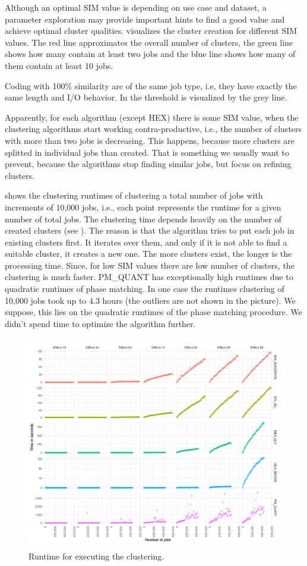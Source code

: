 \documentclass[]{llncs}
\begin{document}
Although an optimal SIM value is depending on use case and dataset, a parameter exploration may provide important hints to find a good value and achieve optimal cluster qualities.
 visualizes the cluster creation for different SIM values.
The red line approximates the overall number of clusters, the green line shows how many contain at least two jobs and the blue line shows how many of them contain at least 10 jobs.

Coding with 100$\%$  similarity are of the same job type, i.e, they have exactly the same length and I/O behavior.
In  the threshold is visualized by the grey line.


Apparently, for each algorithm (except HEX) there is some SIM value, when the clustering algorithms start working contra-productive, i.e., the number of clusters with more than two jobs is decreasing.
This happens, because more clusters are splitted in individual jobs than created.
That is something we usually want to prevent, because the algorithms stop finding similar jobs, but focus on refining clusters.

 shows the clustering runtimes of clustering a total number of jobs with increments of 10,000 jobs, i.e., each point represents the runtime for a given number of total jobs.
The clustering time depends heavily on the number of created clusters (see ).
The reason is that the algorithm tries to put each job in existing clusters first.
It iterates over them, and only if it is not able to find a suitable cluster, it creates a new one.
The more clusters exist, the longer is the processing time.
Since, for low SIM values there are low number of clusters, the clustering is much faster.
PM\_QUANT has exceptionally high runtimes due to quadratic runtimes of phase matching.
In one case the runtimes clustering of 10,000 jobs took up to 4.3 hours (the outliers are not shown in the picture).
We suppose, this lies on the quadratic runtimes of the phase matching procedure.
We didn't spend time to optimize the algorithm further.

\begin{figure}
  \centering
  \includegraphics[width=4.61in,height=3.68in]{./media/image18.png}
  \caption{Runtime for executing the clustering.}
  \label{fig:alg_runtimes}
\end{figure}
\end{document}
